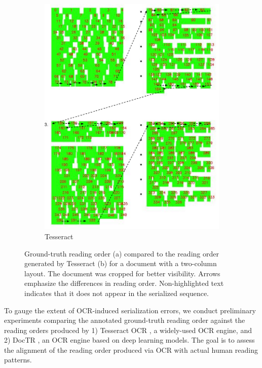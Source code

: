 \begin{figure}[ht]
\begin{subfigure}[b]{0.4\textwidth}
        \includegraphics[width=\textwidth]{images/chapter4/tesseract_multicolumn_with_ro.pdf}
        \caption{Tesseract}
      \end{subfigure}
    \caption{Ground-truth reading order (a) compared to the reading order generated by Tesseract (b) for a document with a two-column layout. The document was cropped for better visibility. Arrows emphasize the differences in reading order. Non-highlighted text indicates that it does not appear in the serialized sequence.}
    \label{fig:reading-orders-multicolumn}
\end{figure}


To gauge the extent of \ac{OCR}-induced serialization errors, we conduct preliminary experiments comparing the annotated ground-truth reading order against the reading orders produced by 1) Tesseract OCR \citep{kay2007tesseract}, a widely-used \ac{OCR} engine, and 2) DocTR \citep{doctr2021}, an \ac{OCR} engine based on deep learning models. The goal is to assess the alignment of the reading order produced via \ac{OCR} with actual human reading patterns.


